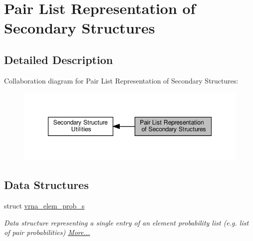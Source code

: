 \hypertarget{group__struct__utils__plist}{}\section{Pair List Representation of Secondary Structures}
\label{group__struct__utils__plist}


\subsection{Detailed Description}
Collaboration diagram for Pair List Representation of Secondary Structures\+:
\nopagebreak
\begin{figure}[H]
\begin{center}
\leavevmode
\includegraphics[width=347pt]{group__struct__utils__plist}
\end{center}
\end{figure}
\subsection*{Data Structures}
\begin{DoxyCompactItemize}
\item 
struct \hyperlink{group__struct__utils__plist_structvrna__elem__prob__s}{vrna\+\_\+elem\+\_\+prob\+\_\+s}
\begin{DoxyCompactList}\small\item\em Data structure representing a single entry of an element probability list (e.\+g. list of pair probabilities)  \hyperlink{group__struct__utils__plist_structvrna__elem__prob__s}{More...}\end{DoxyCompactList}\end{DoxyCompactItemize}

